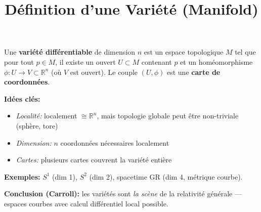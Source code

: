 \documentclass{article}
\title{Définition d'une Variété (Manifold)}
\begin{document}
\maketitle

Une \textbf{variété différentiable} de dimension $n$ est un espace topologique $M$ tel que pour tout $p \in M$, il existe un ouvert $U \subset M$ contenant $p$ et un homéomorphisme $\phi: U \to V \subset \mathbb{R}^n$ (où $V$ est ouvert). Le couple $(U,\phi)$ est une \textbf{carte de coordonnées}.

\textbf{Idées clés:}
\begin{itemize}
    \item \textit{Localité:} localement $\cong \mathbb{R}^n$, mais topologie globale peut être non-triviale (sphère, tore)
    \item \textit{Dimension:} $n$ coordonnées nécessaires localement
    \item \textit{Cartes:} plusieurs cartes couvrent la variété entière
\end{itemize}

\textbf{Exemples:} $S^1$ (dim 1), $S^2$ (dim 2), spacetime GR (dim 4, métrique courbe).

\textbf{Conclusion (Carroll):} les variétés sont \textit{la scène} de la relativité générale — espaces courbes avec calcul différentiel local possible.
\end{document}
